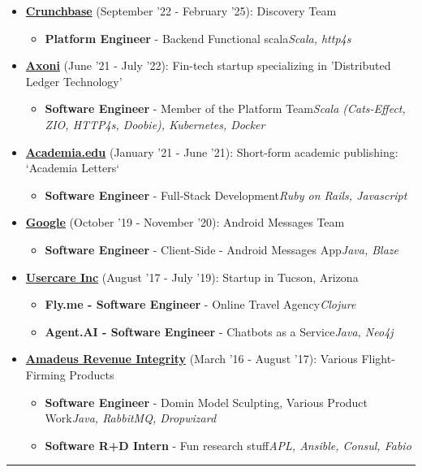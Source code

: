 \documentclass{article}
\begin{document}
\begin{itemize}
\item \href{https://crunchbase.com}{\textbf{Crunchbase}} {(September '22 - February '25)}: Discovery Team 
\begin{itemize}
\item \textbf{Platform Engineer} - Backend Functional scala\newline \textit{Scala, http4s}
\end{itemize}
\item \href{https://axoni.com}{\textbf{Axoni}} {(June '21 - July '22)}: Fin-tech startup specializing in 'Distributed Ledger Technology' 
\begin{itemize}
\item \textbf{Software Engineer} - Member of the Platform Team\newline \textit{Scala (Cats-Effect, ZIO, HTTP4s, Doobie), Kubernetes, Docker}
\end{itemize}
\item \href{https://academia.edu}{\textbf{Academia.edu}} {(January '21 - June '21)}: Short-form academic publishing: `Academia Letters` 
\begin{itemize}
\item \textbf{Software Engineer} - Full-Stack Development\newline \textit{Ruby on Rails, Javascript}
\end{itemize}
\item \href{https://google.com}{\textbf{Google}} {(October '19 - November '20)}: Android Messages Team 
\begin{itemize}
\item \textbf{Software Engineer} - Client-Side - Android Messages App\newline \textit{Java, Blaze}
\end{itemize}
\item \href{https://www.crunchbase.com/organization/usercare}{\textbf{Usercare Inc}} {(August '17 - July '19)}: Startup in Tucson, Arizona 
\begin{itemize}
\item \textbf{Fly.me - Software Engineer} - Online Travel Agency\newline \textit{Clojure}
\item \textbf{Agent.AI - Software Engineer} - Chatbots as a Service\newline \textit{Java, Neo4j}
\end{itemize}
\item \href{https://amadeus.com/en/portfolio/airlines/revenue-integrity}{\textbf{Amadeus Revenue Integrity}} {(March '16 - August '17)}: Various Flight-Firming Products 
\begin{itemize}
\item \textbf{Software Engineer} - Domin Model Sculpting, Various Product Work\newline \textit{Java, RabbitMQ, Dropwizard}
\item \textbf{Software R+D Intern} - Fun research stuff\newline \textit{APL, Ansible, Consul, Fabio}
\end{itemize}
\end{itemize}
\noindent\rule{\linewidth}{1pt}
\end{document}
